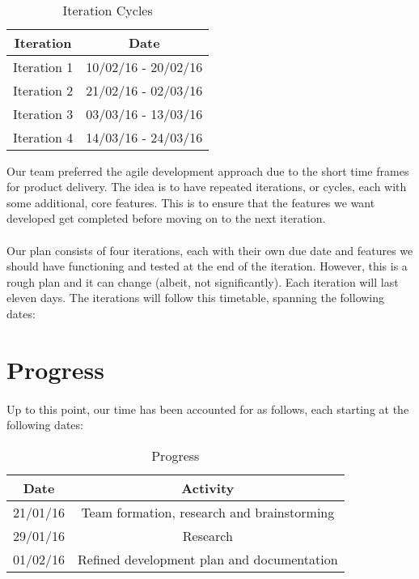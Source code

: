 \documentclass[11pt, a4]{article}
\begin{document}
\paragraph{}
\begin{wraptable}{c}{6cm}
    \begin{tabular}{|c|c|}
    \hline
    \textbf{Iteration} & \textbf{Date}  \\ \hline
    Iteration 1 & 10/02/16 - 20/02/16 \\ \hline
    Iteration 2 & 21/02/16 - 02/03/16 \\ \hline
    Iteration 3 & 03/03/16 - 13/03/16 \\ \hline
    Iteration 4 & 14/03/16 - 24/03/16 \\ \hline
   \end{tabular}    
   \caption{Iteration Cycles}
   \end{wraptable} 
Our team preferred the agile development approach due to the short time frames for product delivery. The idea is to have repeated iterations, or cycles, each with some additional, core features. This is to ensure that the features we want developed get completed before moving on to the next iteration.
\paragraph{}
Our plan consists of four iterations, each with their own due date and features we should have functioning and tested at the end of the iteration. However, this is a rough plan and it can change (albeit, not significantly). Each iteration will last eleven days. The iterations will follow this timetable, spanning the following dates: 

\section{Progress}\label{prog}
\paragraph{}
Up to this point, our time has been accounted for as follows, each starting at the following dates: 
\begin{table}{}
\centering
 \begin{tabular}{|c|c|}
    \hline
    \textbf{Date} & \textbf{Activity}  \\ \hline
    21/01/16 & Team formation, research and brainstorming \\ \hline
    29/01/16 & Research \\ \hline
    01/02/16 & Refined development plan and documentation \\ \hline
\end{tabular}
   \caption{Progress}
\end{table}
\end{document}
